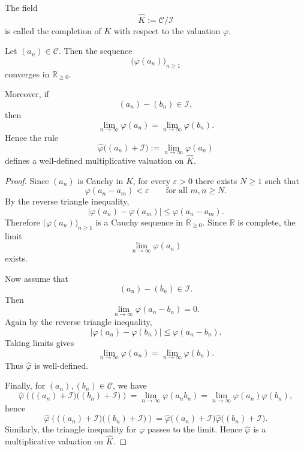 \begin{definition}
    The field
    \[
        \widehat{K}:=\mathcal{C}/\mathcal{I}
    \]
    is called the completion of \(K\) with respect to the valuation \(\varphi\).
\end{definition}

\begin{proposition}
    Let \((a_n)\in \mathcal{C}\). Then the sequence
    \[
        \bigl(\varphi(a_n)\bigr)_{n\geq 1}
    \]
    converges in \(\mathbb{R}_{\geq 0}\).

    Moreover, if
    \[
        (a_n)-(b_n)\in \mathcal{I},
    \]
    then
    \[
        \lim_{n\to\infty}\varphi(a_n)
        =
        \lim_{n\to\infty}\varphi(b_n).
    \]
    Hence the rule
    \[
        \widehat{\varphi}\bigl((a_n)+\mathcal{I}\bigr)
        :=
        \lim_{n\to\infty}\varphi(a_n)
    \]
    defines a well-defined multiplicative valuation on \(\widehat{K}\).
\end{proposition}

\begin{proof}
    Since \((a_n)\) is Cauchy in \(K\), for every \(\varepsilon>0\) there exists
    \(N\geq 1\) such that
    \[
        \varphi(a_n-a_m)<\varepsilon
        \qquad
        \text{for all } m,n\geq N.
    \]
    By the reverse triangle inequality,
    \[
        \left|\varphi(a_n)-\varphi(a_m)\right|
        \leq
        \varphi(a_n-a_m).
    \]
    Therefore \(\bigl(\varphi(a_n)\bigr)_{n\geq 1}\) is a Cauchy sequence in
    \(\mathbb{R}_{\geq 0}\). Since \(\mathbb{R}\) is complete, the limit
    \[
        \lim_{n\to\infty}\varphi(a_n)
    \]
    exists.

    Now assume that
    \[
        (a_n)-(b_n)\in \mathcal{I}.
    \]
    Then
    \[
        \lim_{n\to\infty}\varphi(a_n-b_n)=0.
    \]
    Again by the reverse triangle inequality,
    \[
        \left|\varphi(a_n)-\varphi(b_n)\right|
        \leq
        \varphi(a_n-b_n).
    \]
    Taking limits gives
    \[
        \lim_{n\to\infty}\varphi(a_n)
        =
        \lim_{n\to\infty}\varphi(b_n).
    \]
    Thus \(\widehat{\varphi}\) is well-defined.

    Finally, for \((a_n),(b_n)\in \mathcal{C}\), we have
    \[
        \widehat{\varphi}
        \left(
            \bigl((a_n)+\mathcal{I}\bigr)
            \bigl((b_n)+\mathcal{I}\bigr)
        \right)
        =
        \lim_{n\to\infty}\varphi(a_nb_n)
        =
        \lim_{n\to\infty}\varphi(a_n)\varphi(b_n),
    \]
    hence
    \[
        \widehat{\varphi}
        \left(
            \bigl((a_n)+\mathcal{I}\bigr)
            \bigl((b_n)+\mathcal{I}\bigr)
        \right)
        =
        \widehat{\varphi}\bigl((a_n)+\mathcal{I}\bigr)
        \widehat{\varphi}\bigl((b_n)+\mathcal{I}\bigr).
    \]
    Similarly, the triangle inequality for \(\varphi\) passes to the limit. Hence
    \(\widehat{\varphi}\) is a multiplicative valuation on \(\widehat{K}\).
\end{proof}

